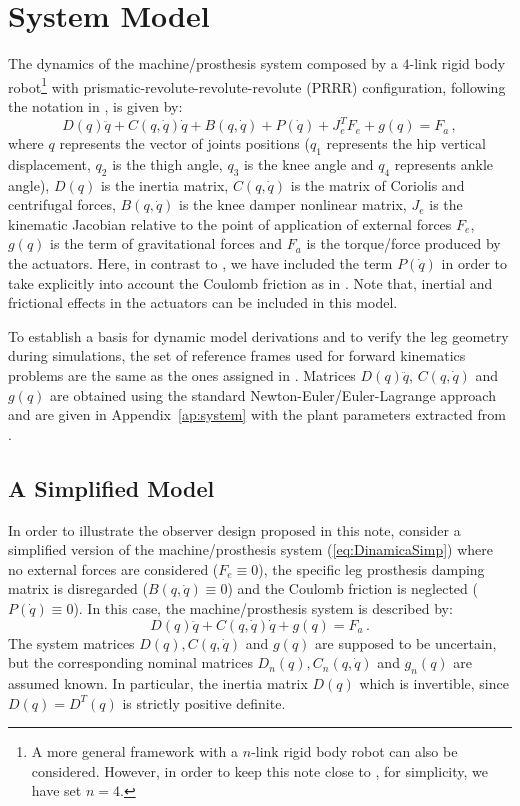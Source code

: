 \documentclass[letterpaper, 10 pt, conference]{ieeeconf}  %
\theoremstyle{plain}
\theoremstyle{definition}
\theoremstyle{remark}
\begin{document}
\section{System Model}
The dynamics of the machine/prosthesis system composed by a $4$-link rigid body robot\footnote{A more general framework with a $n$-link rigid body robot can also be considered. However, in order to keep this note close to \cite{Richter2015}, for simplicity, we have set $n=4$.}  with prismatic-revolute-revolute-revolute (PRRR) configuration, following the notation in \cite{Richter2015}, is given by:
%
\begin{equation}
D(q)\ddot{q} + C(q,\dot{q})\dot{q}+B(q,\dot{q}) + P(\dot{q}) + J_e^T F_e+g(q) = F_a\,,
\label{eq:Dinamica}
\end{equation}
%
where  $q$ represents the vector of joints positions ($q_1$ represents the hip vertical displacement, $q_2$ is the thigh angle, $q_3$ is the knee angle and $q_4$ represents ankle angle), $D(q)$ is the inertia matrix, $C(q,\dot{q})$ is the matrix of Coriolis and centrifugal forces, $B(q,\dot{q})$ is the knee  damper nonlinear matrix, $J_e$ is the kinematic Jacobian relative to the point of application of external forces $F_e$, $g(q)$ is the term of gravitational forces and $F_a$ is the torque/force produced by the actuators. Here, in contrast to \cite{Richter2015}, we have included the term  $P(\dot{q})$ in order to take explicitly into account the Coulomb friction as in \cite{LeeKhalil2015}. Note that, inertial and frictional effects in the actuators can be included in this model. 

To establish a basis for dynamic model derivations and to verify the leg geometry during simulations, the set of reference frames used for forward kinematics problems are the same as the ones assigned in \cite{Richter2015}. Matrices $D(q)\ddot{q}$, $C(q,\dot{q})$ and $g(q)$ are obtained using the standard Newton-Euler/Euler-Lagrange approach and are given in Appendix~\ref{ap:system} with the plant parameters  extracted from \cite{Richter2015}.

\subsection{A Simplified Model}


In order to illustrate the observer design proposed in this note, consider a simplified version of the machine/prosthesis system (\ref{eq:DinamicaSimp}) where no external forces are considered ($F_e \equiv 0$), the specific leg prosthesis damping matrix is disregarded ($B(q,\dot{q}) \equiv 0$) and the  Coulomb friction is neglected  ($P(\dot{q}) \equiv 0$). In this case, the machine/prosthesis system is described by:
%
\begin{equation}
D(q)\ddot{q} + C(q,\dot{q})\dot{q}+g(q) = F_a\,.
\label{eq:DinamicaSimp}
\end{equation}
%
The system matrices $D(q), C(q,\dot{q})$ and $g(q)$ are supposed to be uncertain, but the corresponding nominal matrices  $D_n(q), C_n(q,\dot{q})$ and $g_n(q)$ are assumed known. In particular, the inertia matrix $D(q)$ which is invertible, since $D(q)=D^T(q)$ is strictly positive definite.
\end{document}

